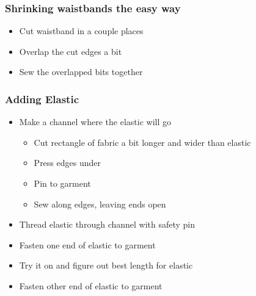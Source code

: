 \documentclass{beamer}
\begin{document}
\begin{frame}[fragile]
\frametitle{Shrinking waistbands the easy way}
\begin{itemize}[<+(1)->]
\item Cut waistband in a couple places
\item Overlap the cut edges a bit
\item Sew the overlapped bits together
\end{itemize}
\end{frame}

\begin{frame}[fragile]
\frametitle{Adding Elastic}
\begin{itemize}[<+(1)->]
\item Make a channel where the elastic will go
    \begin{itemize}
    \item Cut rectangle of fabric a bit longer and wider than elastic
    \item Press edges under
    \item Pin to garment
    \item Sew along edges, leaving ends open
    \end{itemize}
\item Thread elastic through channel with safety pin
\item Fasten one end of elastic to garment
\item Try it on and figure out best length for elastic
\item Fasten other end of elastic to garment
\end{itemize}
\end{frame}

\begin{frame}[fragile]
\titlepage
\end{frame}
\end{document}

